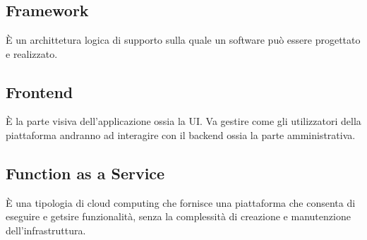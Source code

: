 \section{}
\subsection*{Framework} È un archittetura logica di supporto sulla quale un software può essere progettato e realizzato.

\subsection*{Frontend} È la parte visiva dell'applicazione ossia la UI. Va gestire come gli utilizzatori della piattaforma andranno ad interagire con il backend ossia la parte amministrativa.

\subsection*{Function as a Service} È una tipologia di cloud computing che fornisce una piattaforma che consenta di eseguire e getsire funzionalità, senza la complessità di creazione e manutenzione dell'infrastruttura.